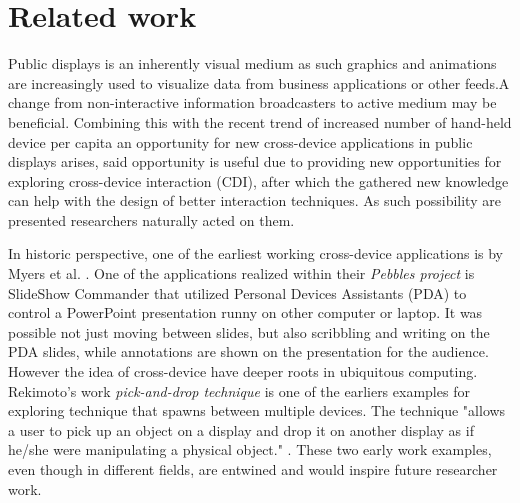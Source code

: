 \section{Related work} \label{sec:relatedwork}

Public displays is an inherently visual medium as such graphics and animations are increasingly used to visualize data from business applications or other feeds.A change from non-interactive information broadcasters to active medium may be beneficial. 
Combining this with the recent trend of increased number of hand-held device per capita an opportunity for new cross-device applications in public displays arises, said opportunity is useful due to providing new opportunities for exploring cross-device interaction (CDI), after which the gathered new knowledge can help with the design of better interaction techniques.
As such possibility are presented researchers naturally acted on them.

In historic perspective, one of the earliest working cross-device applications is by Myers et al. \cite{Myers:2001}. 
One of the applications realized within their \emph{Pebbles project} is SlideShow Commander that utilized Personal Devices Assistants (PDA) to control a PowerPoint presentation runny on other computer or laptop.
It was possible not just moving between slides, but also scribbling and writing on the PDA slides, while annotations are shown on the presentation for the audience. 
However the idea of cross-device have deeper roots in ubiquitous computing. Rekimoto's work \emph{pick-and-drop technique} is one of the earliers examples for exploring technique that spawns between multiple devices. The technique "allows a user to pick up an object on a display and drop it on another display as if he/she were manipulating a physical object." \cite{Rekimoto:1997}. 
These two early work examples, even though in different fields, are entwined and would inspire future researcher work.\\

